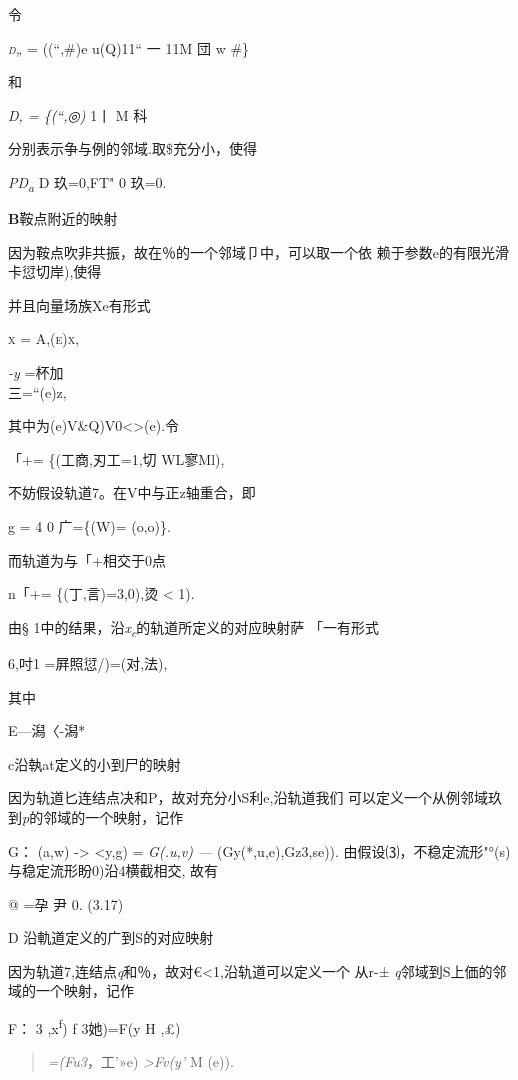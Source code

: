\documentclass{article}
\begin{document}
令

\emph{\textsc{d„}} = ((``,\#)e u(Q)11`` 一 11M 団 w \#\}

和

\emph{D, = \{(``,◎)} 1丨 M 科

分别表示争与例的邻域.取\$充分小，使得

\emph{PD\textsubscript{a}} D 玖=0,FT" 0 玖=0.

\textbf{B}鞍点附近的映射

因为鞍点吹非共振，故在％的一个邻域卩中，可以取一个依
赖于参数e的有限光滑卡愆切岸),使得

并且向量场族Xe有形式

\textsc{x = A,(e)x,}

\emph{-y} =杯加\\
三=``(e)z,

其中为(e)V\&Q)V0\textless{}\textgreater{}(e).令

「+= \{(工商,刃工=1,切 WL寥Ml),

不妨假设轨道7。在V中与正z轴重合，即

g = 4 0 广=\{(W)= (o,o)\}.

而轨道为与「+相交于0点

n「+= \{(丁,言)=3,0),烫\textbar{} \textless{} 1).

由§ 1中的结果，沿\emph{x\textsubscript{c}}的轨道所定义的对应映射萨
「一有形式

6,吋1 =屛照愆/)=(对,法),

其中

E---潟〈-潟*

c沿執at定义的小到尸的映射

因为轨道匕连结点决和P，故对充分小S利\textbar{}e\textbar{},沿轨道我们
可以定义一个从例邻域玖到\emph{p}的邻域的一个映射，记作

G： (a,w) -\textgreater{} \textless{}y,g) = \emph{G(.u,v) ---}
(Gy(*,u,e),Gz3,se)). 由假设⑶，不稳定流形"°(s)与稳定流形盼0)沿4横截相交,
故有

@ =孕 尹 0. (3.17)

D 沿軌道定义的广到S的对应映射

因为轨道7,连结点\emph{q}和％，故对\textbar{}€\textbar{}\textless{}1,沿轨道可以定义一个
从r-± \emph{q}邻域到S上価的邻域的一个映射，记作

F： 3 ,x\textsuperscript{f}) f 3她)=F(y H ,£)

\begin{quote}
\emph{=(Fu3}，工'»e) \emph{\textgreater{}Fv(y'} M (e)).
\end{quote}
\end{document}
